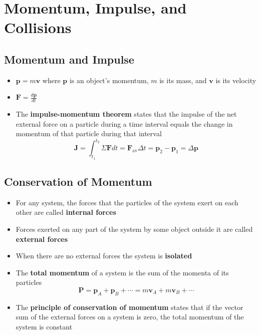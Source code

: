 \documentclass{article}
\begin{document}
\section{Momentum, Impulse, and Collisions}

\subsection{Momentum and Impulse}

\begin{itemize}
  \item $\mathbf{p}=m\mathbf{v}$ where $\mathbf{p}$ is an object's momentum, $m$ is its mass, and $\mathbf{v}$ is its velocity

  \item $\mathbf{F}=\frac{d\mathbf{p}}{dt}$

  \item The \textbf{impulse-momentum theorem} states that the impulse of the net external force on a particle during a time interval equals the change in momentum of that particle during that interval \[\mathbf{J}=\int_{t_1}^{t_2}\Sigma\mathbf{F}dt=\mathbf{F}_\textrm{av}\Delta t=\mathbf{p}_2-\mathbf{p}_1=\Delta\mathbf{p}\]
\end{itemize}

\subsection{Conservation of Momentum}

\begin{itemize}
  \item For any system, the forces that the particles of the system exert on each other are called \textbf{internal forces}

  \item Forces exerted on any part of the system by some object outside it are called \textbf{external forces}

  \item When there are no external forces the system is \textbf{isolated}

  \item The \textbf{total momentum} of a system is the sum of the momenta of its particles \[\mathbf{P}=\mathbf{p}_A+\mathbf{p}_B+\cdots=m\mathbf{v}_A+m\mathbf{v}_B+\cdots\]

  \item The \textbf{principle of conservation of momentum} states that if the vector sum of the external forces on a system is zero, the total momentum of the system is constant
\end{itemize}
\end{document}

